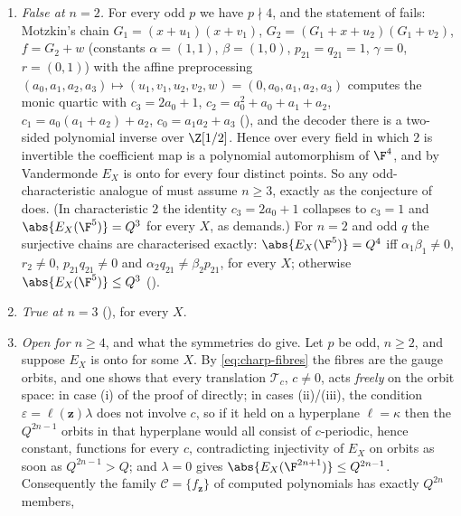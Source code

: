 \begin{remark}
\label{rem:charp-regime}
\leavevmode
\begin{enumerate}
\item[(i)] \emph{False at $n=2$.}  For every odd $p$ we have $p\nmid4$, and the statement
   of  fails: Motzkin's chain $G_1=(x+u_1)(x+v_1)$,
   $G_2=(G_1+x+u_2)(G_1+v_2)$, $f=G_2+w$ (constants $\alpha=(1,1)$, $\beta=(1,0)$,
   $p_{21}=q_{21}=1$, $\gamma=0$, $r=(0,1)$) with the affine preprocessing
   $(a_0,a_1,a_2,a_3)\mapsto(u_1,v_1,u_2,v_2,w)=(0,a_0,a_1,a_2,a_3)$ computes the monic
   quartic with $c_3=2a_0+1$, $c_2=a_0^2+a_0+a_1+a_2$, $c_1=a_0(a_1+a_2)+a_2$,
   $c_0=a_1a_2+a_3$ (), and the decoder there is a two-sided polynomial
   inverse over $\Z[1/2]$.  Hence over every field in which $2$ is invertible the
   coefficient map is a polynomial automorphism of $\F^4$, and by Vandermonde $E_X$ is
   onto for every four distinct points.  So any odd-characteristic analogue of
    must assume $n\ge3$, exactly as the conjecture of
    does.  (In characteristic $2$ the identity $c_3=2a_0+1$ collapses to
   $c_3=1$ and $\abs{E_X(\F^5)}=Q^3$ for every $X$, as  demands.)
   For $n=2$ and odd $q$ the surjective chains are characterised exactly:
   $\abs{E_X(\F^5)}=Q^4$ iff $\alpha_1\beta_1\neq0$, $r_2\neq0$, $p_{21}q_{21}\neq0$ and
   $\alpha_2q_{21}\neq\beta_2p_{21}$, for every $X$; otherwise $\abs{E_X(\F^5)}\le Q^3$
   ().
\item[(ii)] \emph{True at $n=3$} (), for every $X$.
\item[(iii)] \emph{Open for $n\ge4$}, and what the symmetries do give.  Let $p$ be odd,
   $n\ge2$, and suppose $E_X$ is onto for some $X$.  By \eqref{eq:charp-fibres} the
   fibres are the gauge orbits, and one shows that every translation $\mathcal T_c$,
   $c\neq0$, acts \emph{freely} on the orbit space: in case (i) of the proof of
    directly; in cases (ii)/(iii), the condition
   $\varepsilon=\ell(\mathbf z)\lambda$ does not involve $c$, so if it held on a
   hyperplane $\ell=\kappa$ then the $Q^{2n-1}$ orbits in that hyperplane would all
   consist of $c$-periodic, hence constant, functions for every $c$, contradicting
   injectivity of $E_X$ on orbits as soon as $Q^{2n-1}>Q$; and $\lambda=0$ gives
   $\abs{E_X(\F^{2n+1})}\le Q^{2n-1}$.  Consequently the family
   $\mathcal C=\{f_{\mathbf z}\}$ of computed polynomials has exactly $Q^{2n}$ members,

\end{enumerate}
\end{remark}
